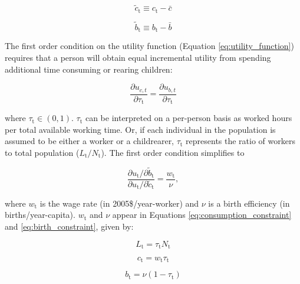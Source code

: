 \documentclass[letterpaper,12pt]{article}
\begin{document}
\begin{equation} \label{eq:c_tilde}
	\tilde c_\mathrm{t} \equiv c_\mathrm{t} - \bar c
\end{equation}

\begin{equation} \label{eq:b_tilde}
	\tilde b_\mathrm{t} \equiv b_\mathrm{t} - \bar b
\end{equation}

The first order condition on the utility function (Equation \ref{eq:utility_function}) requires that a person will obtain equal incremental utility from spending additional time consuming or rearing children:

\begin{equation} \label{eq:first_order_condition_def}
	\frac{\partial u_{c,t}}{\partial \tau_\mathrm{t}} = \frac{\partial u_{b,t}}{\partial \tau_\mathrm{t}}
\end{equation}

\noindent where $\tau_\mathrm{t} \in (0,1)$. $\tau_\mathrm{t}$ can be interpreted on a per-person basis as worked hours per total available working time. Or, if each individual in the population is assumed to be either a worker or a childrearer, $\tau_\mathrm{t}$ represents the ratio of workers to total population ($L_\mathrm{t}/N_\mathrm{t}$). The first order condition simplifies to 

\begin{equation} \label{eq:first_order_condition_simplified}
	\frac{\partial u_\mathrm{t}/ \partial\tilde b_\mathrm{t}}{\partial u_\mathrm{t}/ \partial\tilde c_\mathrm{t}} = \frac{w_\mathrm{t}}{\nu},
\end{equation}

\noindent where $w_\mathrm{t}$ is the wage rate (in 2005\$/year-worker) and $\nu$ is a birth efficiency (in births/year-capita). $w_\mathrm{t}$ and $\nu$ appear in Equations \ref{eq:consumption_constraint} and \ref{eq:birth_constraint}, given by:

\begin{equation}\label{eq:pop_work}
	L_\mathrm{t} = \tau_\mathrm{t} N_\mathrm{t}
\end{equation}

\begin{equation} \label{eq:consumption_constraint}
	c_\mathrm{t} = w_\mathrm{t} \tau_\mathrm{t}
\end{equation}

\begin{equation} \label{eq:birth_constraint}
	b_\mathrm{t} = \nu (1-\tau_\mathrm{t})
\end{equation}
\end{document}
